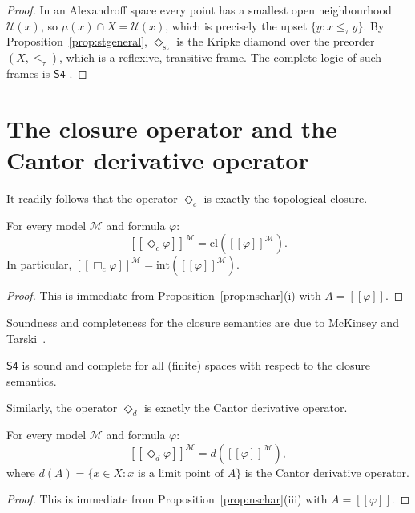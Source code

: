 \documentclass[submission,copyright,creativecommons]{eptcs}
\newcommand{\cl}{\mathrm{cl}}
\newcommand{\Int}{\mathrm{int}}
\newcommand{\sem}[1]{[\![#1]\!]}
\newcommand{\diam}{\Diamond}
\newcommand{\sq}{\Box}
\begin{document}
\begin{proof}
In an Alexandroff space every point has a smallest open neighbourhood $\mathcal{U}(x)$, so $\mu(x) \cap X = \mathcal{U}(x)$, which is precisely the upset $\{y : x \leq_\tau y\}$.
By Proposition~\ref{prop:stgeneral}, $\diam_\mathrm{st}$ is the Kripke diamond over the preorder $(X, \leq_\tau)$, which is a reflexive, transitive frame.
The complete logic of such frames is $\mathsf{S4}$ \cite{BlackburnDeRijkeVenema2001}.
\end{proof}


\section{The closure operator and the Cantor derivative operator}
\label{sec:closure}

It readily follows that the operator $\diam_c$ is exactly
the topological closure.

\begin{proposition}
\label{prop:clequiv}
For every model $\mathcal{M}$ and formula $\varphi$:
\[
  \sem{\diam_c\varphi}^{\mathcal{M}} = \cl(\sem{\varphi}^{\mathcal{M}}).
\]
In particular, $\sem{\sq_c\varphi}^{\mathcal{M}} = \Int(\sem{\varphi}^{\mathcal{M}})$.
\end{proposition}
\begin{proof}
This is immediate from Proposition~\ref{prop:nschar}(i) with $A = \sem{\varphi}$.
\end{proof}
Soundness and completeness for the closure semantics %
are due to McKinsey and Tarski~\cite{McKinseyTarski1944}.
\begin{theorem}
$\mathsf{S4}$ is sound and complete for all (finite) spaces with respect to the closure semantics.
\end{theorem}
Similarly, the operator $\diam_d$ is exactly the Cantor derivative operator.

\begin{proposition}
\label{prop:dequiv}
For every model $\mathcal{M}$ and formula $\varphi$:
\[
  \sem{\diam_d\varphi}^{\mathcal{M}} = d(\sem{\varphi}^{\mathcal{M}}),
\]
where $d(A) = \{x \in X : x \text{ is a limit point of } A\}$
is the Cantor derivative operator.
\end{proposition}

\begin{proof}
This is immediate from Proposition~\ref{prop:nschar}(iii) with $A = \sem{\varphi}$.
\end{proof}
\end{document}
